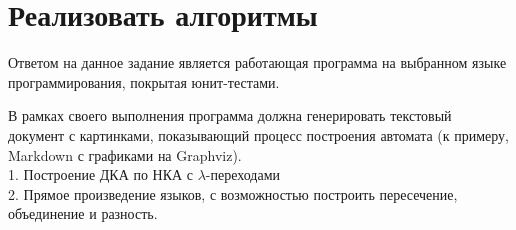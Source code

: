 \documentclass[a4paper, 12pt]{article}
\begin{document}
\section{Реализовать алгоритмы}
Ответом на данное задание является работающая программа на выбранном языке программирования, покрытая юнит-тестами.

В рамках своего выполнения программа должна генерировать текстовый документ с картинками, показывающий процесс построения автомата (к примеру, Markdown с графиками на Graphviz).\\
1. Построение ДКА по НКА с $\lambda$-переходами \\
2. Прямое произведение языков, с возможностью построить пересечение, объединение и разность.
\end{document}
